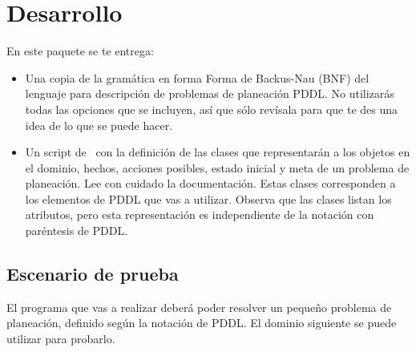 \section{Desarrollo}

En este paquete se te entrega:
\begin{itemize}
 \item Una copia de la gramática en forma  Forma de Backus-Nau (BNF) del lenguaje para descripción de problemas de planeación PDDL.
       No utilizarás todas las opciones que se incluyen, así que sólo revísala para que te des una 
       idea de lo que se puede hacer.
 \item Un script de \Python\ con la definición de las clases que representarán a los objetos en
       el dominio, hechos, acciones posibles, estado inicial y meta de un problema de planeación.
       Lee con cuidado la documentación.  Estas clases corresponden a los elementos de PDDL que
       vas a utilizar.  Observa que las clases listan los atributos, pero esta representación es
       independiente de la notación con paréntesis de PDDL.
\end{itemize}


\subsection{Escenario de prueba}

El programa que vas a realizar deberá poder resolver un pequeño problema de planeación, definido según la notación de PDDL.  El dominio siguiente se puede utilizar para probarlo.


